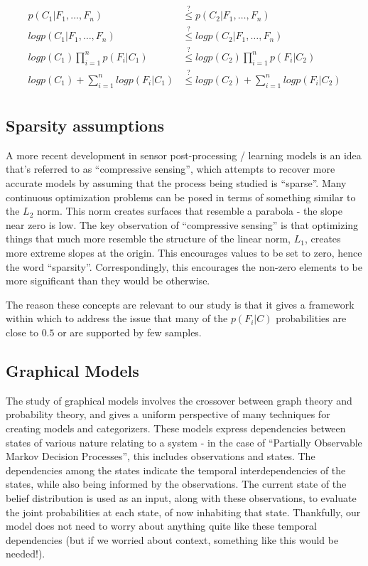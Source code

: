 \documentclass[12pt,a4paper]{article}
\begin{document}
\begin{align*}
p(C_1 \vert F_1,\dots,F_n) & \stackrel{\text{?}}{\leq} p(C_2 \vert F_1,\dots,F_n) \\
log p(C_1 \vert F_1,\dots,F_n) & \stackrel{\text{?}}{\leq} log p(C_2 \vert F_1,\dots,F_n) \\
log p(C_1) \prod_{i=1}^n p(F_i \vert C_1) & \stackrel{\text{?}}{\leq} log p(C_2) \prod_{i=1}^n p(F_i \vert C_2) \\
log p(C_1) + \sum_{i=1}^n log p(F_i \vert C_1) & \stackrel{\text{?}}{\leq} log p(C_2) + \sum_{i=1}^n log p(F_i \vert C_2) \\
\end{align*}

\subsection { Sparsity assumptions }

A more recent development in sensor post-processing / learning models is an idea that's referred to as ``compressive sensing'', which attempts to recover more accurate models by assuming that the process being studied is ``sparse''.  Many continuous optimization problems can be posed in terms of something similar to the $ L_2 $ norm.  This norm creates surfaces that resemble a parabola - the slope near zero is low.  The key observation of ``compressive sensing'' is that optimizing things that much more resemble the structure of the linear norm, $ L_1 $, creates more extreme slopes at the origin.  This encourages values to be set to zero, hence the word ``sparsity''.  Correspondingly, this encourages the non-zero elements to be more significant than they would be otherwise.

The reason these concepts are relevant to our study is that it gives a framework within which to address the issue that many of the $ p(F_i \vert C) $ probabilities are close to $ 0.5 $ or are supported by few samples.


\subsection{ Graphical Models }

The study of graphical models involves the crossover between graph theory and probability theory, and gives a uniform perspective of many techniques for creating models and categorizers.  These models express dependencies between states of various nature relating to a system - in the case of ``Partially Observable Markov Decision Processes'', this includes observations and states.  The dependencies among the states indicate the temporal interdependencies of the states, while also being informed by the observations.  The current state of the belief distribution is used as an input, along with these observations, to evaluate the joint probabilities at each state, of now inhabiting that state.  Thankfully, our model does not need to worry about anything quite like these temporal dependencies (but if we worried about context, something like this would be needed!).
\end{document}

